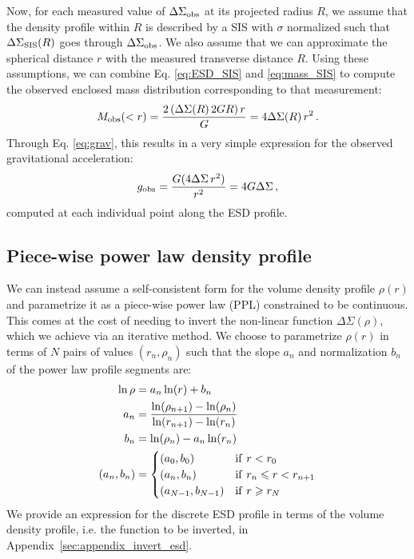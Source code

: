 \documentclass[usenatbib]{mnras}
\newcommand{\un}[1]{_{\rm #1}}
\begin{document}
Now, for each measured value of $\Delta\Sigma\un{obs}$ at its projected radius $R$, we assume that the density profile within $R$ is described by a SIS with $\sigma$ normalized such that $\Delta\Sigma\un{SIS}(R)$ goes through $\Delta\Sigma\un{obs}$. We also assume that we can approximate the spherical distance $r$ with the measured transverse distance $R$. Using these assumptions, we can combine Eq. \ref{eq:ESD_SIS} and \ref{eq:mass_SIS} to compute the observed enclosed mass distribution corresponding to that measurement:
\begin{equation}\label{eq:Mobs}
	M\un{obs}(<r) = \frac{2 \, (\Delta\Sigma(R) \, 2 G R) \, r}{G} = 4 \Delta\Sigma(R) \, r^2 \, .
\end{equation}
Through Eq. \ref{eq:grav}, this results in a very simple expression for the observed gravitational acceleration:
\begin{equation}
g\un{obs} = \frac{G (4 \Delta\Sigma \, r^2)}{r^2} = 4 G \Delta\Sigma \, ,
\end{equation}
computed at each individual point along the ESD profile.

\subsection{Piece-wise power law density profile}
\label{sec:piece-wise_powerlaw}

We can instead assume a self-consistent form for the volume density profile $\rho(r)$ and parametrize it as a piece-wise power law (PPL) constrained to be continuous. This comes at the cost of needing to invert the non-linear function $\Delta\Sigma(\rho)$, which we achieve via an iterative method. We choose to parametrize $\rho(r)$ in terms of $N$ pairs of values $(r_n,\rho_n)$ such that the slope $a_n$ and normalization $b_n$ of the power law profile segments are:
\begin{align}
	\ln\rho &= a_n \ln(r) + b_n \\
	a_n &= \frac{\ln(\rho_{n+1})-\ln(\rho_n)}{\ln(r_{n+1})-\ln(r_n)}\\
	b_n &= \ln(\rho_n) - a_n\ln(r_n)\\
	(a_n, b_n) &=
	\begin{cases}
		(a_0, b_0) & {\rm if}\ r < r_0\\
		(a_n, b_n) & {\rm if}\ r_n \leq r < r_{n+1}\\
		(a_{N-1}, b_{N-1}) & {\rm if}\ r \geq r_N
	\end{cases}
	\label{eq:rho_piecewise_powerlaw}\end{align}
We provide an expression for the discrete ESD profile in terms of the volume density profile, i.e. the function to be inverted, in Appendix~\ref{sec:appendix_invert_esd}.
\end{document}
